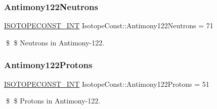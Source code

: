 \subsubsection{\texorpdfstring{Antimony122\+Neutrons}{Antimony122Neutrons}}
{\footnotesize\ttfamily \mbox{\hyperlink{group___isotope_const-_macros_ga5f18360b3e99483a35c32d789e62621c}{I\+S\+O\+T\+O\+P\+E\+C\+O\+N\+S\+T\+\_\+\+I\+NT}} Isotope\+Const\+::\+Antimony122\+Neutrons = 71}

\$ \$ Neutrons in Antimony-\/122. \mbox{\label{group___isotope_const-_antimony-_sb122_ga5d9570a8b335579fd8fe4eebdd9edf25}} 
\subsubsection{\texorpdfstring{Antimony122\+Protons}{Antimony122Protons}}
{\footnotesize\ttfamily \mbox{\hyperlink{group___isotope_const-_macros_ga5f18360b3e99483a35c32d789e62621c}{I\+S\+O\+T\+O\+P\+E\+C\+O\+N\+S\+T\+\_\+\+I\+NT}} Isotope\+Const\+::\+Antimony122\+Protons = 51}

\$ \$ Protons in Antimony-\/122. 